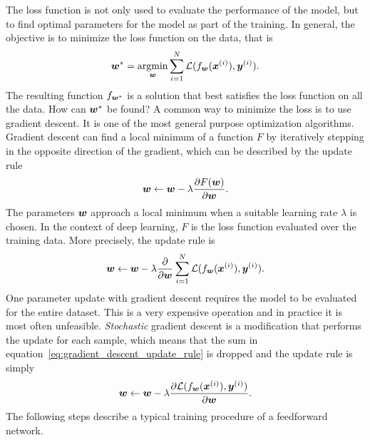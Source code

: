 		The loss function is not only used to evaluate the performance of the model, but to find optimal parameters for the model as part of the training.
		In general, the objective is to minimize the loss function on the data, that is
		\begin{equation}\label{eq:optimal_parameter_neural_network}
			\bm{w}^\ast = \operatorname*{argmin}_{\bm{w}} 
			\sum_{i = 1}^{N} 
				\mathcal{L}(f_{\bm{w}}(\bm{x}^{(i)}), \bm{y}^{(i)}).
		\end{equation}
		The resulting function $f_{\bm{w}^\ast}$ is a solution that best satisfies the loss function on all the data.
		How can $\bm{w}^\ast$ be found?
		A common way to minimize the loss is to use gradient descent.
		It is one of the most general purpose optimization algorithms.
		Gradient descent can find a local minimum of a function $F$ by iteratively stepping in the opposite direction of the gradient, which can be described by the update rule
		\begin{equation}
			\bm{w} \leftarrow 
			\bm{w} - \lambda \frac{\partial F(\bm{w})}{\partial \bm{w}}.
		\end{equation}
		The parameters $\bm{w}$ approach a local minimum when a suitable learning rate $\lambda$ is chosen.
		In the context of deep learning, $F$ is the loss function evaluated over the training data.
		More precisely, the update rule is
		\begin{equation}\label{eq:gradient_descent_update_rule}
			\bm{w} \leftarrow 
			\bm{w} - \lambda 
			\frac{\partial}{\partial \bm{w}}
			\sum_{i = 1}^{N} 
				\mathcal{L}(f_{\bm{w}}(\bm{x}^{(i)}), \bm{y}^{(i)}).
		\end{equation}
		One parameter update with gradient descent requires the model to be evaluated for the entire dataset.
		This is a very expensive operation and in practice it is most often unfeasible.
		\emph{Stochastic} gradient descent is a modification that performs the update for each sample, which means that the sum in equation~\ref{eq:gradient_descent_update_rule} is dropped and the update rule is simply
		\begin{equation}\label{eq:stochastic_gradient_descent_update_rule}
			\bm{w} \leftarrow 
			\bm{w} - \lambda 
			\frac{\partial \mathcal{L}(f_{\bm{w}}(\bm{x}^{(i)}), \bm{y}^{(i)})}{\partial \bm{w}}.
		\end{equation}
		The following steps describe a typical training procedure of a feedforward network.
